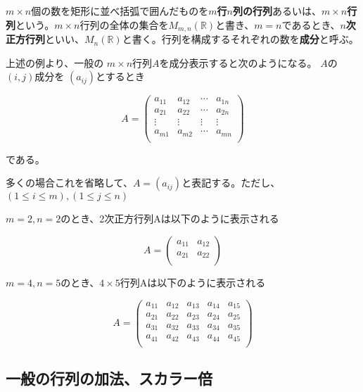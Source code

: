 \documentclass[dvipdfmx,autodetect-engine]{jsarticle}
\begin{document}
$m \times n$個の数を矩形に並べ括弧で囲んだものを{\bf $m$行$n$列の行列}あるいは、{\bf $m \times n$行列}という。$m \times n$行列の全体の集合を$M_{m,n}(\mathbb{R})$と書き、$m = n$であるとき、{\bf $n$次正方行列}といい、$M_n(\mathbb{R})$と書く。行列を構成するそれぞれの数を{\bf 成分}と呼ぶ。


上述の例より、一般の $m \times n$行列$A$を成分表示すると次のようになる。 $A$の $(i, j)$成分を $(a_{ij})$とするとき

$$
A = \begin{pmatrix}
a_{11} & a_{12} & \cdots & a_{1n} \\
a_{21} & a_{22} & \cdots & a_{2n} \\
\vdots & \vdots & \vdots & \vdots \\
a_{m1} & a_{m2} & \cdots & a_{mn} \\
\end{pmatrix}
$$

である。

多くの場合これを省略して、$A = (a_{ij})$と表記する。ただし、
$(1 \leq i \leq m), (1 \leq j \leq n)$


$m = 2, n = 2$のとき、2次正方行列Aは以下のように表示される

$$
A = \begin{pmatrix}
a_{11} & a_{12} \\
a_{21} & a_{22} \\
\end{pmatrix}
$$


$m = 4, n = 5$のとき、$4 \times 5$行列Aは以下のように表示される

$$
A = \begin{pmatrix}
a_{11} & a_{12} & a_{13} & a_{14} & a_{15} \\
a_{21} & a_{22} & a_{23} & a_{24} & a_{25} \\
a_{31} & a_{32} & a_{33} & a_{34} & a_{35} \\
a_{41} & a_{42} & a_{43} & a_{44} & a_{45} \\
\end{pmatrix}
$$

\subsection{一般の行列の加法、スカラー倍}\label{subsection:generalMatrixAdditionAndScalarMultiple}
\end{document}
